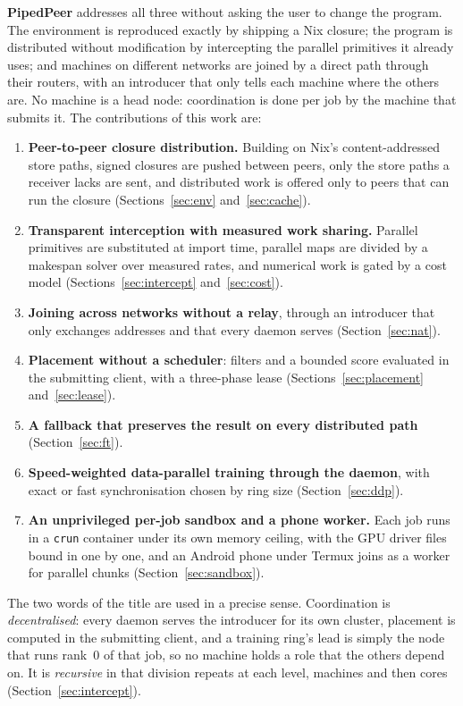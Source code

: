 \textbf{PipedPeer} addresses all three without asking the user to change the
program. The environment is reproduced exactly by shipping a Nix closure; the
program is distributed without modification by intercepting the parallel
primitives it already uses; and machines on different networks are joined by a
direct path through their routers, with an introducer that only tells each
machine where the others are. No machine is a head node: coordination is done
per job by the machine that submits it. The contributions of this work are:

\begin{enumerate}[leftmargin=*, label=\arabic*.]
  \item \textbf{Peer-to-peer closure distribution.} Building on Nix's
  content-addressed store paths, signed closures are pushed between peers, only
  the store paths a receiver lacks are sent, and distributed work is offered
  only to peers that can run the closure (Sections~\ref{sec:env}
  and~\ref{sec:cache}).
  \item \textbf{Transparent interception with measured work sharing.} Parallel
  primitives are substituted at import time, parallel maps are divided by a
  makespan solver over measured rates, and numerical work is gated by a cost
  model (Sections~\ref{sec:intercept} and~\ref{sec:cost}).
  \item \textbf{Joining across networks without a relay}, through an introducer
  that only exchanges addresses and that every daemon serves
  (Section~\ref{sec:nat}).
  \item \textbf{Placement without a scheduler}: filters and a bounded score
  evaluated in the submitting client, with a three-phase lease
  (Sections~\ref{sec:placement} and~\ref{sec:lease}).
  \item \textbf{A fallback that preserves the result on every distributed path}
  (Section~\ref{sec:ft}).
  \item \textbf{Speed-weighted data-parallel training through the daemon}, with
  exact or fast synchronisation chosen by ring size (Section~\ref{sec:ddp}).
  \item \textbf{An unprivileged per-job sandbox and a phone worker.} Each job
  runs in a \texttt{crun} container under its own memory ceiling, with the GPU
  driver files bound in one by one, and an Android phone under Termux joins as a
  worker for parallel chunks (Section~\ref{sec:sandbox}).
\end{enumerate}

The two words of the title are used in a precise sense. Coordination is
\emph{decentralised}: every daemon serves the introducer for its own cluster,
placement is computed in the submitting client, and a training ring's lead is
simply the node that runs rank~0 of that job, so no machine holds a role that
the others depend on. It is \emph{recursive} in that division repeats at each
level, machines and then cores (Section~\ref{sec:intercept}).

